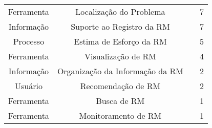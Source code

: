 \begin{table}[htbp]
{\begin{tabular}{|c|c|l|c|}
\multirow{3}{*}{Ferramenta}   & \multirow{3}{*}{Localização do Problema}      & \cite{Bangcharoensap:2012:LSC:2419061.2419428,corley2011recovering,Nguyen:2012:MAR:2393596.2393671}      & \multirow{3}{*}{7}  \\
                              &                                               & \cite{Thung:2014:BIT:2635868.2661678,Wong:2014:BBF:2705615.2706096}                                      &                     \\
                              &                                               & \cite{Romo:2015:TAT:2745802.2745833,thung2013automatic}                                                  &                     \\ \hline
\multirow{2}{*}{Informação}   & \multirow{2}{*}{Suporte ao Registro da RM}    & \cite{Bettenburg2008a,Correa2013b,moran2015auto,Moran:2015:EAA:2786805.2807557}                          & \multirow{2}{*}{7}  \\
                              &                                               & \cite{Tu:2014:MQI:2677832.2677844,White:2015:GRR:2820282.2820291,Wu2011a}                                &                     \\ \hline
\multirow{2}{*}{Processo}     & \multirow{2}{*}{Estima de Esforço da RM}      & \cite{Bhattacharya:2011:BTP:1985441.1985472,Nagwani2010,thung2012would}                                  & \multirow{2}{*}{5}  \\
                              &                                               & \cite{Vijayakumar2014,xia2015automatic}                                                                  &                     \\ \hline
Ferramenta                    & Visualização de RM                            & \cite{dal2013closer,dal2014bug,hora2012bug,takama2013application}                                        & 4                   \\ \hline
Informação                    & Organização da Informação da RM               & \cite{mani2012ausum,otoom2016severity}                                                                   & 2                   \\ \hline
Usuário                       & Recomendação de RM                            & \cite{malheiros2012source,Wang2011bug}                                                                   & 2                   \\ \hline
Ferramenta                   & Busca de RM                                   & \cite{liu2014faceted}                                                                                    & 1                   \\ \hline
Ferramenta                    & Monitoramento de RM                           & \cite{Aggarwal:2014:MIT:2593801.2593810}                                                                 & 1                   \\ \hline
\end{tabular}%
}
\end{table}
